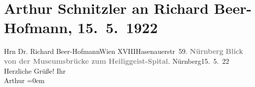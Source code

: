 

         
         \renewcommand{\erwaehntePersonen}{Personen: Richard Beer-Hofmann}
         \renewcommand{\erwaehnteOrte}{Orte: Hasenauerstraße, Heilig-Geist-Spital, Museumsbrücke Nürnberg, Nürnberg, Wien, XVIII., Währing}
         \renewcommand{\erwaehnteWerke}{}
               \section[Arthur Schnitzler an Richard Beer-Hofmann, 15. 5. 1922]{ Arthur Schnitzler an Richard Beer-Hofmann, 15. 5. 1922}\nopagebreak{}\rehead{ }\begin{ledgroupsized}[t]{13cm}\normalsize\beginnumbering \toendnotes[C]{\smallbreak\pagebreak[2]} 
\pstart{}{\pb}Hrn Dr. Richard Beer-Hofmann\pend{}\pstart{}Wien XVIII\pend{}\pstart{}Hasenauerstr 59.\pend{}{\bigskip}\pstart
           \noindent{}\centering{}{\pb}\textcolor{gray}{\textbf{Nürnberg}}\pend
           \pstart
           \noindent{}\centering{}\textcolor{gray}{\textbf{Blick von der Museumsbrücke zum Heiliggeist-Spital.}}\pend
           \pstart
           \raggedleft{}{\pb}Nürnberg15. 5. 22\pend
           \pstart
           Herzliche Grüße!\pend
           \pstart
           Ihr{\\[\baselineskip]}\spacefill\mbox{Arthur}\pend
           \leftskip=0em{}
         
         \endnumbering{}\end{ledgroupsized}  \newcommand{\dateiname}{L02382}\newcommand{\titel}{Arthur Schnitzler an Richard Beer-Hofmann, 15. 5. 1922}\newcommand{\editorInnen}{Martin Anton Müller und Gerd-Hermann Susen}
      